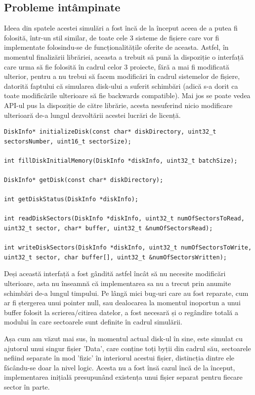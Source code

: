 \subsection{Probleme intâmpinate}

Ideea din spatele acestei simulări a fost încă de la început aceea de a putea fi folosită, într-un stil similar, de toate cele 3 sisteme de fișiere care vor fi implementate folosindu-se de funcționalitățile oferite de aceasta. Astfel, în momentul finalizării librăriei, aceasta a trebuit să pună la dispoziție o interfață care urma să fie folosită în cadrul celor 3 proiecte, fără a mai fi modificată ulterior, pentru a nu trebui să facem modificări în cadrul sistemelor de fișiere, datorită faptului că simularea disk-ului a suferit schimbări (adică s-a dorit ca toate modificările ulterioare să fie backwards compatible). Mai jos se poate vedea API-ul pus la dispoziție de către  librărie, acesta nesuferind nicio modificare ulterioară de-a lungul dezvoltării acestei lucrări de licență.

\bigskip

\lstset{style=code-snyppet-style}
\begin{lstlisting}
DiskInfo* initializeDisk(const char* diskDirectory, uint32_t sectorsNumber, uint16_t sectorSize);

int fillDiskInitialMemory(DiskInfo *diskInfo, uint32_t batchSize);

DiskInfo* getDisk(const char* diskDirectory);

int getDiskStatus(DiskInfo *diskInfo);

int readDiskSectors(DiskInfo *diskInfo, uint32_t numOfSectorsToRead, uint32_t sector, char* buffer, uint32_t &numOfSectorsRead);

int writeDiskSectors(DiskInfo *diskInfo, uint32_t numOfSectorsToWrite, uint32_t sector, char buffer[], uint32_t &numOfSectorsWritten);
\end{lstlisting}

\bigskip

Deși această interfață a fost gândită astfel încât să nu necesite modificări ulterioare, asta nu înseamnă că implementarea sa nu a trecut prin anumite schimbări de-a lungul timpului. Pe lângă mici bug-uri care au fost reparate, cum ar fi ștergerea unui pointer null, sau dealocarea la momentul inoportun a unui buffer folosit la scrierea/citirea datelor, a fost necesară și o regândire totală a modului în care sectoarele sunt definite în cadrul simulării.

Așa cum am văzut mai sus, în momentul actual disk-ul în sine, este simulat cu ajutorul unui singur fișier 'Data', care conține toți byții din cadrul său, sectoarele nefiind separate în mod 'fizic' în interiorul acestui fișier, distincția dintre ele făcându-se doar la nivel logic. Acesta nu a fost însă cazul încă de la început, implementarea inițială presupunând existența unui fișier separat pentru fiecare sector în parte.

